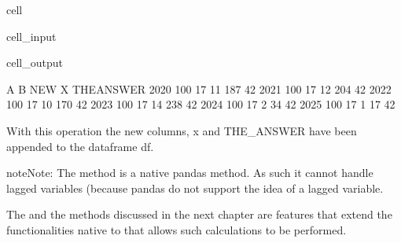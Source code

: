 \documentclass[letterpaper,10pt,english]{jupyterBook}
\begin{document}
\begin{sphinxuseclass}{cell}\begin{sphinxVerbatimInput}

\begin{sphinxuseclass}{cell_input}
\begin{sphinxVerbatim}[commandchars=\\\{\}]
\end{sphinxVerbatim}

\end{sphinxuseclass}\end{sphinxVerbatimInput}
\begin{sphinxVerbatimOutput}

\begin{sphinxuseclass}{cell_output}
\begin{sphinxVerbatim}[commandchars=\\\{\}]
        A   B  NEW    X  THE\PYGZus{}ANSWER
2020  100  17   11  187          42
2021  100  17   12  204          42
2022  100  17   10  170          42
2023  100  17   14  238          42
2024  100  17    2   34          42
2025  100  17    1   17          42
\end{sphinxVerbatim}

\end{sphinxuseclass}\end{sphinxVerbatimOutput}

\end{sphinxuseclass}
\sphinxAtStartPar
With this operation the new columns, x and THE\_ANSWER have been appended to the dataframe df.

\begin{sphinxadmonition}{note}{Note:}
\sphinxAtStartPar
The  method is a native pandas method.  As such it cannot handle lagged variables (because pandas do not support the idea of a lagged variable.

\sphinxAtStartPar
The  and the  methods discussed in the next chapter are  features that extend the functionalities native to  that allows such calculations to be performed.
\end{sphinxadmonition}
\end{document}
